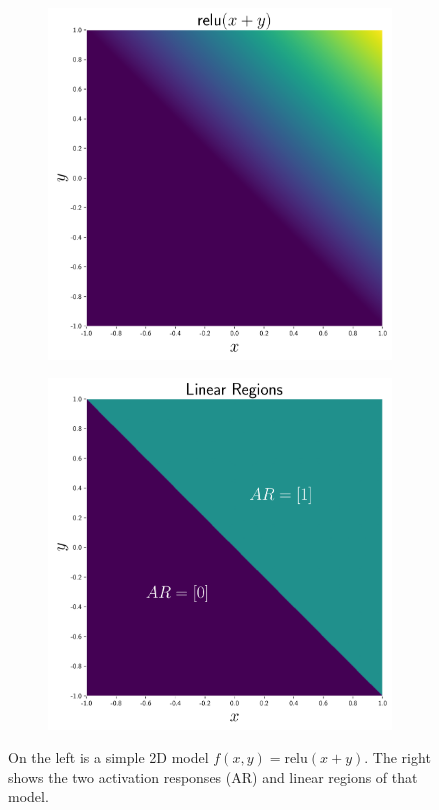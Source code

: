 \begin{figure}[ht!]
    \centering
    \begin{subfigure}{.45\textwidth}
      \centering
      \includegraphics[width=.9\linewidth]{lrc_output}
    \end{subfigure}
    \begin{subfigure}{.45\textwidth}
      \centering
      \includegraphics[width=.9\linewidth]{lrc_ars}
    \end{subfigure}
\caption[Activation responses and linear regions of a simple 2D model]{On the left is a simple 2D model $f(x,y) = \text{relu}(x+y)$. The right
shows the two activation responses (AR) and linear regions of that model.}
\label{fig:lrc_2d_example}
\end{figure}
